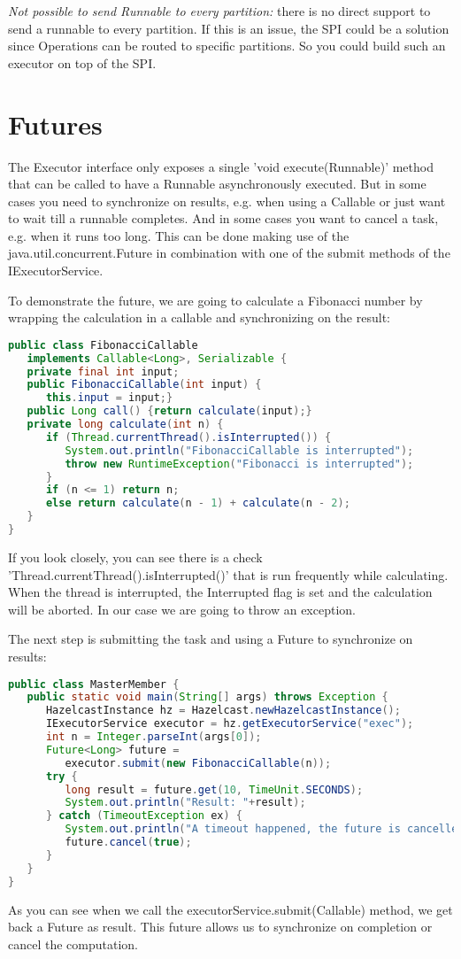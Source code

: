 \emph{Not possible to send Runnable to every partition:} there is no direct support to send a runnable to every partition. If this is an issue, the SPI could be a solution since Operations can be routed to specific partitions. So you could build such an executor on top of the SPI.

\section{Futures}
The  Executor interface only exposes a single 'void execute(Runnable)' method that can be called to have a Runnable asynchronously executed. But in some cases you need to synchronize on results, e.g. when using a Callable or just want to wait till a runnable completes. And in some cases you want to cancel a task, e.g. when it runs too long. This can be done making use of the java.util.concurrent.Future in combination with one of the submit methods of the IExecutorService.

To demonstrate the future, we are going to calculate a Fibonacci number by wrapping the calculation in a callable and synchronizing on the result:
\begin{lstlisting}[language=java]
public class FibonacciCallable 
   implements Callable<Long>, Serializable {
   private final int input;
   public FibonacciCallable(int input) {
      this.input = input;}
   public Long call() {return calculate(input);}
   private long calculate(int n) {
      if (Thread.currentThread().isInterrupted()) {
         System.out.println("FibonacciCallable is interrupted");
         throw new RuntimeException("Fibonacci is interrupted");
      }
      if (n <= 1) return n;
      else return calculate(n - 1) + calculate(n - 2);
   }
}
\end{lstlisting}
If you look closely, you can see there is a check 'Thread.currentThread().isInterrupted()' that is run frequently while calculating. When the thread is interrupted, the Interrupted flag is set and the calculation will be aborted. In our case we are going to throw an exception.

The next step is submitting the task and using a Future to synchronize on results:
\begin{lstlisting}[language=java]
public class MasterMember {
   public static void main(String[] args) throws Exception {
      HazelcastInstance hz = Hazelcast.newHazelcastInstance();
      IExecutorService executor = hz.getExecutorService("exec");
      int n = Integer.parseInt(args[0]);
      Future<Long> future = 
         executor.submit(new FibonacciCallable(n));
      try {
         long result = future.get(10, TimeUnit.SECONDS);
         System.out.println("Result: "+result);
      } catch (TimeoutException ex) {
         System.out.println("A timeout happened, the future is cancelled");
         future.cancel(true);
      }
   }
}
\end{lstlisting}
As you can see when we call the executorService.submit(Callable) method, we get back a Future as result. This future allows us to synchronize on completion or cancel the computation. 

